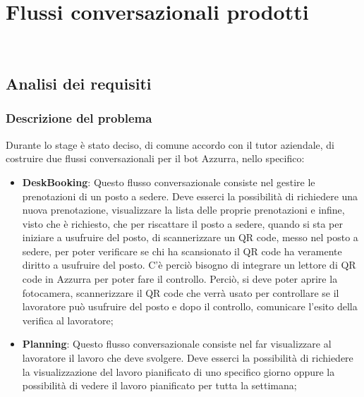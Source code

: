 
\chapter{Flussi conversazionali prodotti}
\label{cap:flussi di conversazione}

\\

\section{Analisi dei requisiti}
\subsection{Descrizione del problema}
Durante lo stage è stato deciso, di comune accordo con il tutor aziendale, di costruire due flussi conversazionali per il \gls{bot}\ap{[g]} Azzurra, nello specifico:
\begin{itemize}
	\item \textbf{DeskBooking}: Questo flusso conversazionale consiste nel gestire le prenotazioni di un posto a sedere. Deve esserci la possibilità di richiedere una nuova prenotazione, visualizzare la lista delle proprie prenotazioni e infine, visto che è richiesto, che per riscattare il posto a sedere, quando si sta per iniziare a usufruire del posto, di scannerizzare un \gls{QR code}\ap{[g]}, messo nel posto a sedere, per poter verificare se chi ha scansionato il \gls{QR code}\ap{[g]} ha veramente diritto a usufruire del posto. C'è perciò bisogno di integrare un lettore di \gls{QR code}\ap{[g]} in Azzurra per poter fare il controllo. Perciò, si deve poter aprire la fotocamera, scannerizzare il \gls{QR code}\ap{[g]} che verrà usato per controllare se il lavoratore può usufruire del posto e dopo il controllo, comunicare l'esito della verifica al lavoratore;
	\item \textbf{Planning}: Questo flusso conversazionale consiste nel far visualizzare al lavoratore il lavoro che deve svolgere. Deve esserci la possibilità di richiedere la visualizzazione del lavoro pianificato di uno specifico giorno oppure la possibilità di vedere il lavoro pianificato per tutta la settimana;
\end{itemize}
